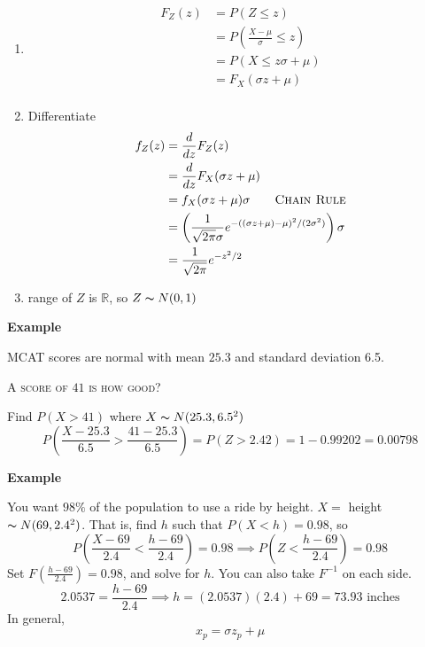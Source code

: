 \begin{enumerate}
    \item \begin{align*}
              F_Z(z) & =P(Z\le z)                               \\
                     & =P\left(\frac{X-\mu}{\sigma}\le z\right) \\
                     & =P\left(X\le z\sigma + \mu\right)        \\
                     & =F_X(\sigma z+\mu)                       \\
          \end{align*}
    \item Differentiate
          \begin{align*}
              f_Z(z) & =\frac{d}{dz}F_Z(z)                                                                    \\
                     & =\frac{d}{dz}F_X(\sigma z+\mu)                                                         \\
                     & =f_X(\sigma z+\mu)\sigma \qquad \textsc{Chain Rule}                                    \\
                     & =\left(\frac{1}{\sqrt{2\pi}\sigma}e^{-((\sigma z+\mu)-\mu)^2/(2\sigma^2)}\right)\sigma \\
                     & =\frac{1}{\sqrt{2\pi}}e^{-z^2/2}
          \end{align*}
    \item range of $ Z $ is $ \mathbb{R} $, so $ Z \thicksim N(0,1) $
\end{enumerate}

\textbf{Example}

MCAT scores are normal with mean $ 25.3 $ and standard deviation 6.5.

\textsc{A score of $ 41 $ is how good?}

Find $ P(X>41) $ where $ X \thicksim N(25.3,6.5^2) $
\[ P\left(\frac{X-25.3}{6.5}>\frac{41-25.3}{6.5}\right)=P(Z>2.42)=1-0.99202=0.00798 \]

\textbf{Example}

You want $ 98\% $ of the population to use a ride by height.
$ X= $ height $ \thicksim N(69,2.4^2) $. That is, find $ h $
such that $ P(X<h)=0.98 $, so
\[ P\left(\frac{X-69}{2.4}<\frac{h-69}{2.4}\right)=0.98\implies P\left(Z<\frac{h-69}{2.4}\right)=0.98\]
Set $F(\frac{h-69}{2.4})=0.98 $, and solve for $ h $. You can also take $ F^{-1} $ on each side.
\[ 2.0537=\frac{h-69}{2.4}\implies h=(2.0537)(2.4)+69=73.93\text{ inches} \]
In general,
\[ x_p=\sigma z_p+\mu \]
